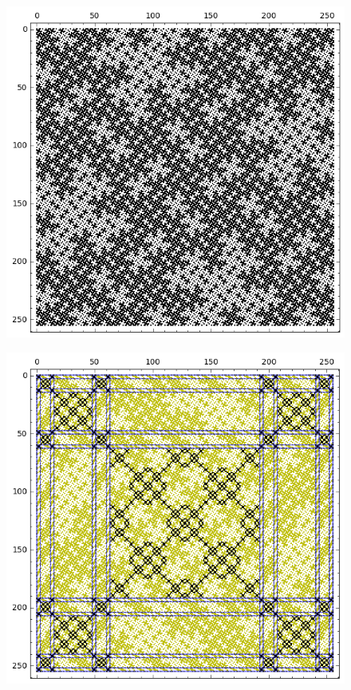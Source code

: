 \documentclass[12pt,a4paper]{article}
\begin{document}
\begin{figure}
\centering
\begin{minipage}{.48\textwidth}
  \centering
  \includegraphics[width=.9\linewidth]{../matrix_plot/sigma_4_bent_cayley_graph_index_matrix.png}
  \label{fig:sigma_4_bent_cayley_graph_index_matrix}
\end{minipage}%
\begin{minipage}{.48\textwidth}
  \centering
  \includegraphics[width=.9\linewidth]{../matrix_plot/tau_4_bent_cayley_graph_index_matrix.png}
  \label{fig:tau_4_bent_cayley_graph_index_matrix}
\end{minipage}
\end{figure}
\end{document}
